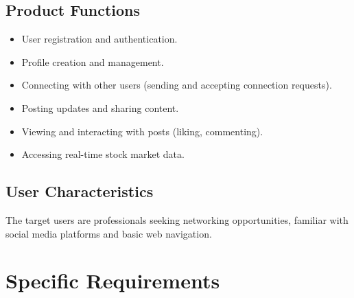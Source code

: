 \documentclass[12pt,a4paper]{report}
\begin{document}
\subsection{Product Functions}
\begin{itemize}
    \item User registration and authentication.
    \item Profile creation and management.
    \item Connecting with other users (sending and accepting connection requests).
    \item Posting updates and sharing content.
    \item Viewing and interacting with posts (liking, commenting).
    \item Accessing real-time stock market data.
\end{itemize}

\subsection{User Characteristics}
The target users are professionals seeking networking opportunities, familiar with social media platforms and basic web navigation.

\section{Specific Requirements}
\end{document}
